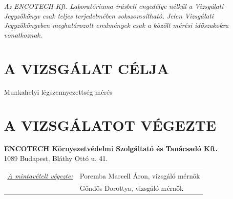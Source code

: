 \documentclass[a4paper,12pt]{article}
\begin{document}
	\begin{center}
		{\scriptsize 
			\textit{
				Az ENCOTECH Kft. Laboratóriuma írásbeli engedélye nélkül a Vizsgálati Jegyzőkönyv csak teljes terjedelmében sokszorosítható. 
				Jelen Vizsgálati Jegyzőkönyvben meghatározott eredmények csak a közölt mérési időszakokra vonatkoznak.
		}}  
	\end{center}
	
	\newpage
	

	\tableofcontents
	

	\newpage  %
	\pagestyle{report}
	
	
	\section{A VIZSGÁLAT CÉLJA}
		\begin{adjustwidth}{1cm}{0cm}
		Munkahelyi légszennyezettség mérés
		\end{adjustwidth}
	
	
	\section{A VIZSGÁLATOT VÉGEZTE}
		\begin{adjustwidth}{1cm}{0cm}
			\noindent
			\textbf{ENCOTECH Környezetvédelmi Szolgáltató és Tanácsadó Kft.} \\
			1089 Budapest, Bláthy Ottó u. 41.
			
			\vspace{1.0em} %
			
			\noindent
			\begin{tabular}{ p{5.5cm} p{8cm} } 
				\textit{\underline{A mintavételt végezte:}} & Poremba Marcell Áron, vizsgáló mérnök \\ & Göndös Dorottya, vizsgáló mérnök \\ 
			\end{tabular}
		\end{adjustwidth}
	
\end{document}
